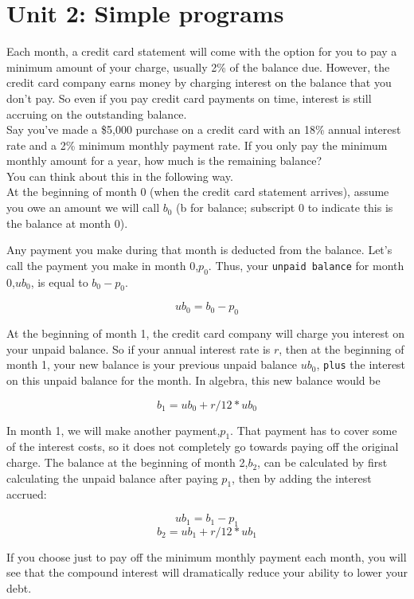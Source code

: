 \documentclass{article}
\begin{document}
\pagebreak

{}
\section*{Unit 2: Simple programs}
Each month, a credit card statement will come with the option for you to pay a
minimum amount of your charge, usually 2\% of the balance due. However, the credit
card company earns money by charging interest on the balance that you don't pay.
So even if you pay credit card payments on time, interest is still accruing on
the outstanding balance.\\

Say you've made a \$5,000 purchase on a credit card with an 18\% annual interest
rate and a 2\% minimum monthly payment rate. If you only pay the minimum monthly
amount for a year, how much is the remaining balance?\\

You can think about this in the following way.\\
At the beginning of month 0 (when the credit card statement arrives), assume you
owe an amount we will call $b_0$ (b for balance; subscript 0 to indicate this is the
balance at month 0).

Any payment you make during that month is deducted from the balance. Let's call
the payment you make in month 0,$p_0$. Thus, your \verb|unpaid balance| for month 0,$ub_0$, is
equal to $b_0-p_0$.

\[ub_0 = b_0 - p_0\]

At the beginning of month 1, the credit card company will charge you interest on
your unpaid balance. So if your annual interest rate is $r$, then at the beginning
of month 1, your new balance is your previous unpaid balance $ub_0$, \verb|plus| the interest
on this unpaid balance for the month. In algebra, this new balance would be

\[b_1 = ub_0 + r/12 * ub_0\]

In month 1, we will make another payment,$p_1$. That payment has to cover some of
the interest costs, so it does not completely go towards paying off the original
charge. The balance at the beginning of month 2,$b_2$, can be calculated by first
calculating the unpaid balance after paying $p_1$, then by adding the interest accrued:

\[ub_1 = b_1 - p_1\]
\[b_2 = ub_1 + r/12 * ub_1\]

If you choose just to pay off the minimum monthly payment each month, you will
see that the compound interest will dramatically reduce your ability to lower
your debt.
\end{document}
